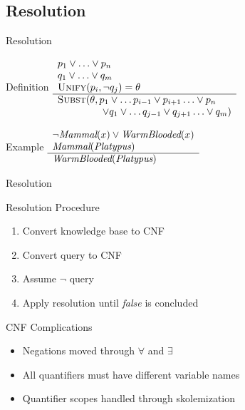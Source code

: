 \documentclass[12pt]{beamer}
\newcommand{\SC}[1]{\mbox{\sc#1}}
\newcommand{\EM}[1]{\mbox{\em#1}}
\begin{document}
\subsection{Resolution}
\begin{frame}{Resolution}
	\begin{block}{Definition}
		$
		\begin{array}{l}
			p_1 \lor \ldots \lor p_n \\
			q_1 \lor \ldots \lor q_m \\
			\SC{Unify}(p_i, \lnot q_j) = \theta \\
			\hline
			\SC{Subst}(\theta, p_1 \lor \ldots p_{i-1} \lor p_{i+1} \ldots \lor p_n \\
			\hspace{4.5em} \lor q_1 \lor \ldots q_{j-1} \lor q_{j+1}  \ldots \lor q_m)
		\end{array}
		$
	\end{block}
	\pause
	\begin{block}{Example}
		$
		\begin{array}{l}
			\lnot \EM{Mammal}(x) \lor \EM{WarmBlooded}(x) \\
			\EM{Mammal}(\EM{Platypus}) \\
			\hline
			\EM{WarmBlooded}(\EM{Platypus})
		\end{array}
		$
	\end{block}
\end{frame}
\begin{frame}{Resolution}
	\begin{block}{Resolution Procedure}
		\begin{enumerate}
			\item Convert knowledge base to CNF
			\item Convert query to CNF
			\item Assume $\lnot$ query
			\item Apply resolution until \EM{false} is concluded
		\end{enumerate}
	\end{block}
	\pause
	\begin{block}{CNF Complications}
		\begin{itemize}
			\item Negations moved through $\forall$ and $\exists$
			\item All quantifiers must have different variable names
			\item Quantifier scopes handled through \alert{skolemization}
		\end{itemize}
	\end{block}
\end{frame}
\end{document}
